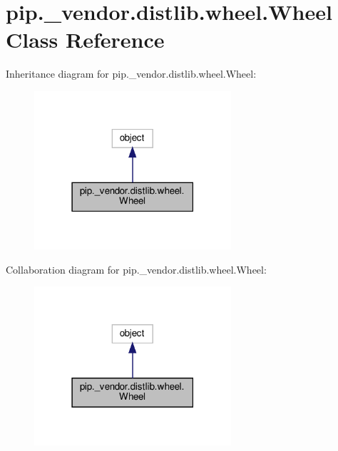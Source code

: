 \hypertarget{classpip_1_1__vendor_1_1distlib_1_1wheel_1_1Wheel}{}\section{pip.\+\_\+vendor.\+distlib.\+wheel.\+Wheel Class Reference}
\label{classpip_1_1__vendor_1_1distlib_1_1wheel_1_1Wheel}


Inheritance diagram for pip.\+\_\+vendor.\+distlib.\+wheel.\+Wheel\+:
\nopagebreak
\begin{figure}[H]
\begin{center}
\leavevmode
\includegraphics[width=207pt]{classpip_1_1__vendor_1_1distlib_1_1wheel_1_1Wheel__inherit__graph}
\end{center}
\end{figure}


Collaboration diagram for pip.\+\_\+vendor.\+distlib.\+wheel.\+Wheel\+:
\nopagebreak
\begin{figure}[H]
\begin{center}
\leavevmode
\includegraphics[width=207pt]{classpip_1_1__vendor_1_1distlib_1_1wheel_1_1Wheel__coll__graph}
\end{center}
\end{figure}
